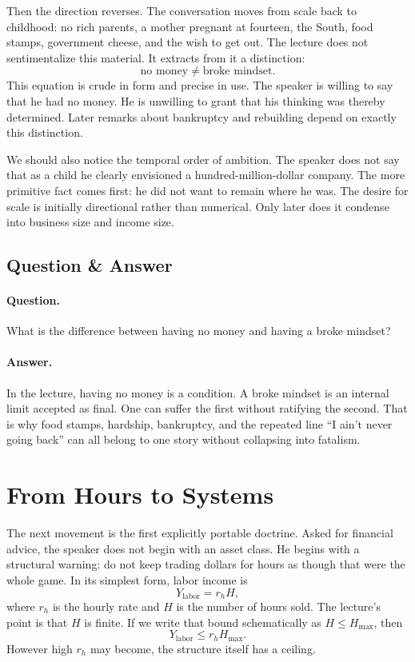 Then the direction reverses. The conversation moves from scale back to childhood: no rich parents, a mother pregnant at fourteen, the South, food stamps, government cheese, and the wish to get out. The lecture does not sentimentalize this material. It extracts from it a distinction:
\begin{equation}
\text{no money} \neq \text{broke mindset}.
\end{equation}
This equation is crude in form and precise in use. The speaker is willing to say that he had no money. He is unwilling to grant that his thinking was thereby determined. Later remarks about bankruptcy and rebuilding depend on exactly this distinction.

We should also notice the temporal order of ambition. The speaker does not say that as a child he clearly envisioned a hundred-million-dollar company. The more primitive fact comes first: he did not want to remain where he was. The desire for scale is initially directional rather than numerical. Only later does it condense into business size and income size.

\subsection{Question \& Answer}

\paragraph{Question.} What is the difference between having no money and having a broke mindset?

\paragraph{Answer.} In the lecture, having no money is a condition. A broke mindset is an internal limit accepted as final. One can suffer the first without ratifying the second. That is why food stamps, hardship, bankruptcy, and the repeated line ``I ain't never going back'' can all belong to one story without collapsing into fatalism.

\section{From Hours to Systems}

The next movement is the first explicitly portable doctrine. Asked for financial advice, the speaker does not begin with an asset class. He begins with a structural warning: do not keep trading dollars for hours as though that were the whole game. In its simplest form, labor income is
\begin{equation}
Y_{\text{labor}} = r_h H,
\end{equation}
where \(r_h\) is the hourly rate and \(H\) is the number of hours sold. The lecture's point is that \(H\) is finite. If we write that bound schematically as \(H \le H_{\max}\), then
\begin{equation}
Y_{\text{labor}} \le r_h H_{\max}.
\end{equation}
However high \(r_h\) may become, the structure itself has a ceiling.

